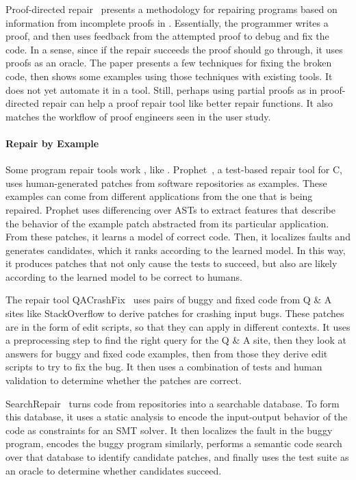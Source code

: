 Proof-directed repair~\cite{dennis2006proof} presents a methodology
for repairing programs based on information from incomplete proofs in .
Essentially, the programmer writes a proof, and then uses feedback
from the attempted proof to debug and fix the code.
In a sense, since if the repair succeeds the proof should go through,
it uses proofs as an oracle. The paper presents a few techniques for fixing the broken code,
then shows some examples using those techniques with existing tools.
It does not yet automate it in a tool.
Still, perhaps using partial proofs as in proof-directed repair can help a proof repair tool like \sysnamelong
better repair functions.
It also matches the workflow of proof engineers seen in the  user study.

\paragraph{Repair by Example}
Some program repair tools work , like \sysname.
Prophet~\cite{Long:2016:APG:2837614.2837617}, a test-based repair tool for C,
uses human-generated patches from software repositories as examples.
These examples can come from different applications from the one that is being repaired.
Prophet uses differencing over ASTs %
to extract features that describe the behavior of the example patch abstracted from its particular application.
From these patches, it learns a model of correct code. Then,
it localizes faults and generates candidates, which it ranks according to the learned model.
In this way, it produces patches that not only cause the tests to succeed, but also
are likely according to the learned model to be correct to humans.

The repair tool QACrashFix~\cite{gao2015fixing} uses pairs of buggy and fixed code from Q \& A sites like
StackOverflow to derive patches for crashing input bugs. These patches are in the form of edit scripts,
so that they can apply in different contexts. %
It uses a preprocessing step to find the right query for the Q \& A site, then they
look at answers for buggy and fixed code examples, then from those they derive edit scripts to try to fix the bug.
It then uses a combination of tests and human validation to determine whether the patches are correct.

SearchRepair~\cite{Ke:2015:RPS:2916135.2916260} turns code from repositories into a searchable database.
To form this database, it uses a static analysis to encode the input-output behavior of the code as constraints for an SMT solver.
It then localizes the fault in the buggy program,
encodes the buggy program similarly, performs a semantic code search over that database to identify candidate patches,
and finally uses the test suite as an oracle to determine whether candidates succeed.

